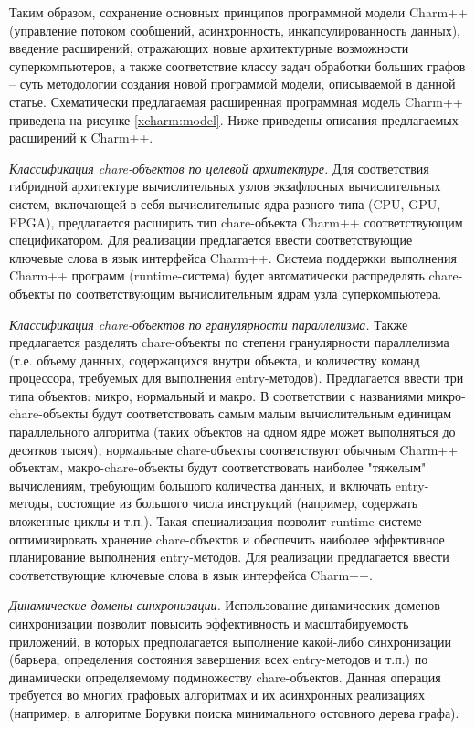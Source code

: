 \documentclass[11pt, oneside, a4paper]{article}
\begin{document}
Таким образом, сохранение основных принципов программной модели Charm++ (управление потоком сообщений, асинхронность, инкапсулированность данных), введение расширений, отражающих новые архитектурные возможности суперкомпьютеров, а также соответствие классу задач обработки больших графов – суть методологии создания новой программой модели, описываемой в данной статье. Схематически предлагаемая расширенная программная модель Charm++ приведена на рисунке \ref{xcharm:model}. 
Ниже приведены описания предлагаемых расширений к Charm++.

\textit{Классификация chare-объектов по целевой архитектуре.} Для соответствия гибридной архитектуре вычислительных узлов экзафлосных вычислительных систем, включающей в себя вычислительные ядра разного типа (CPU, GPU, FPGA), предлагается расширить тип chare-объекта Charm++ соответствующим спецификатором. Для реализации предлагается ввести соответствующие ключевые слова в язык интерфейса Charm++. Система поддержки выполнения Charm++ программ (runtime-система) будет автоматически распределять chare-объекты по соответствующим вычислительным ядрам узла суперкомпьютера. 

\textit{Классификация chare-объектов по гранулярности параллелизма.} Также предлагается разделять chare-объекты по степени гранулярности параллелизма (т.е. объему данных, содержащихся внутри объекта, и количеству команд процессора, требуемых для выполнения entry-методов). Предлагается ввести три типа объектов: микро, нормальный и макро. В соответствии с названиями микро-chare-объекты будут соответствовать самым малым вычислительным единицам параллельного алгоритма (таких объектов на одном ядре может выполняться до десятков тысяч), нормальные chare-объекты соответствуют обычным Charm++ объектам, макро-chare-объекты будут соответствовать наиболее "тяжелым" вычислениям, требующим большого количества данных, и включать entry-методы, состоящие из большого числа инструкций (например, содержать вложенные циклы и т.п.). Такая специализация позволит runtime-системе оптимизировать хранение chare-объектов и обеспечить наиболее эффективное планирование выполнения entry-методов. Для реализации предлагается ввести соответствующие ключевые слова в язык интерфейса Charm++. 

\textit{Динамические домены синхронизации.} Использование динамических доменов синхронизации позволит повысить эффективность и масштабируемость приложений, в которых предполагается выполнение какой-либо синхронизации (барьера, определения состояния завершения всех entry-методов и т.п.)  по динамически определяемому подмножеству chare-объектов. Данная операция требуется во многих графовых алгоритмах и их асинхронных реализациях (например, в алгоритме Борувки поиска минимального остовного дерева графа).
\end{document}
